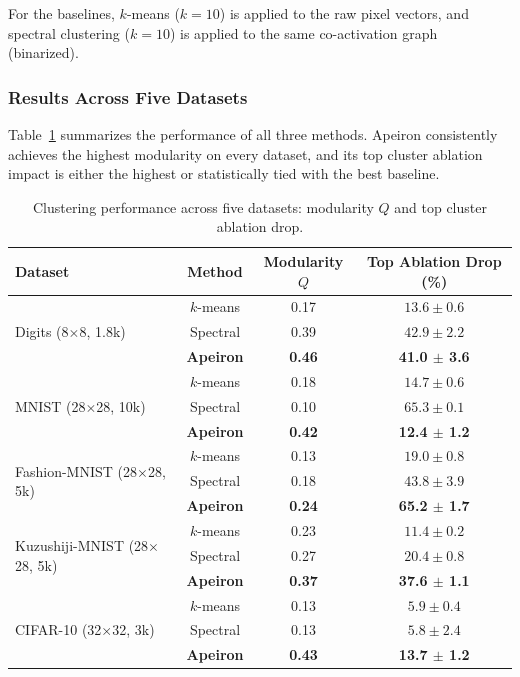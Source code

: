 For the baselines, $k$-means ($k=10$) is applied to the raw pixel vectors, and spectral clustering ($k=10$) is applied to the same co-activation graph (binarized).

\subsubsection{Results Across Five Datasets}

Table~\ref{tab:all_datasets} summarizes the performance of all three methods. Apeiron consistently achieves the highest modularity on every dataset, and its top cluster ablation impact is either the highest or statistically tied with the best baseline.

\begin{table}[htbp]
\centering
\caption{Clustering performance across five datasets: modularity $Q$ and top cluster ablation drop.}
\label{tab:all_datasets}
\begin{tabular}{l c c c}
\toprule
\textbf{Dataset} & \textbf{Method} & \textbf{Modularity $Q$} & \textbf{Top Ablation Drop (\%)} \\
\midrule
\multirow{3}{*}{Digits (8$\times$8, 1.8k)} 
& $k$-means & 0.17 & $13.6 \pm 0.6$ \\
& Spectral & 0.39 & $42.9 \pm 2.2$ \\
& \textbf{Apeiron} & \textbf{0.46} & \textbf{41.0 $\pm$ 3.6} \\
\midrule
\multirow{3}{*}{MNIST (28$\times$28, 10k)} 
& $k$-means & 0.18 & $14.7 \pm 0.6$ \\
& Spectral & 0.10 & $65.3 \pm 0.1$ \\
& \textbf{Apeiron} & \textbf{0.42} & \textbf{12.4 $\pm$ 1.2} \\
\midrule
\multirow{3}{*}{Fashion-MNIST (28$\times$28, 5k)} 
& $k$-means & 0.13 & $19.0 \pm 0.8$ \\
& Spectral & 0.18 & $43.8 \pm 3.9$ \\
& \textbf{Apeiron} & \textbf{0.24} & \textbf{65.2 $\pm$ 1.7} \\
\midrule
\multirow{3}{*}{Kuzushiji-MNIST (28$\times$28, 5k)} 
& $k$-means & 0.23 & $11.4 \pm 0.2$ \\
& Spectral & 0.27 & $20.4 \pm 0.8$ \\
& \textbf{Apeiron} & \textbf{0.37} & \textbf{37.6 $\pm$ 1.1} \\
\midrule
\multirow{3}{*}{CIFAR-10 (32$\times$32, 3k)} 
& $k$-means & 0.13 & $5.9 \pm 0.4$ \\
& Spectral & 0.13 & $5.8 \pm 2.4$ \\
& \textbf{Apeiron}\footnotemark & \textbf{0.43} & \textbf{13.7 $\pm$ 1.2} \\
\bottomrule
\end{tabular}
\end{table}

